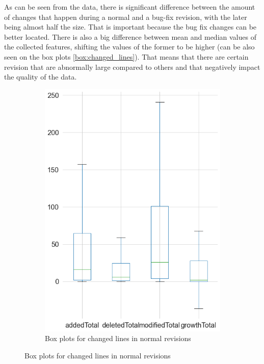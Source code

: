 As can be seen from the data, there is significant difference between the amount of changes that happen during a normal and a bug-fix revision, with the later being almost half the size. That is important because the bug fix changes can be better located. There is also a big difference between mean and median values of the collected features, shifting the values of the former to be higher (can be also seen on the box plots \cref{box:changed_lines}). That means that there are certain revision that are abnormally large compared to others and that negatively impact the quality of the data. 

\begin{figure}[H]
	\begin{subfigure}{0.5\textwidth}
		\centering
		\includegraphics[scale=0.3]{./src/data_analysis/normal_box_lines.png}
		\caption{Box plots for changed lines in normal revisions}
	\end{subfigure}%

\end{figure}
